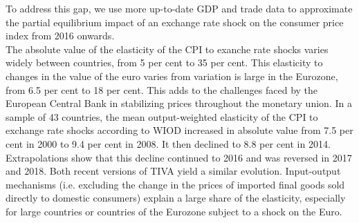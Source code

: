 \documentclass[11pt,a4paper]{article}
\begin{document}
To address this gap, we use more up-to-date GDP and trade data to approximate the partial equilibrium impact of an exchange rate shock on the consumer price index from 2016 onwards.\\
The absolute value of the elasticity of the CPI to exanche rate shocks varies widely between countries, from 5 per cent to 35 per cent. This elasticity to changes in the value of the euro varies from variation is large in the Eurozone, from 6.5 per cent to 18 per cent. This adds to the challenges faced by the European Central Bank in stabilizing prices throughout the monetary union. In a sample of 43 countries, the mean output-weighted elasticity of the CPI to exchange rate shocks according to WIOD increased in absolute value from 7.5 per cent in 2000 to 9.4 per cent in 2008.
It then declined to 8.8 per cent in 2014.
Extrapolations show that this decline continued to 2016 and was reversed in 2017 and 2018.
Both recent versions of TIVA yield a similar evolution.
Input-output mechanisms (i.e. excluding the change in the prices of imported final goods sold directly to domestic consumers) explain a large share of the elasticity, especially for large countries or countries of the Eurozone subject to a shock on the Euro.\\

\end{document}
